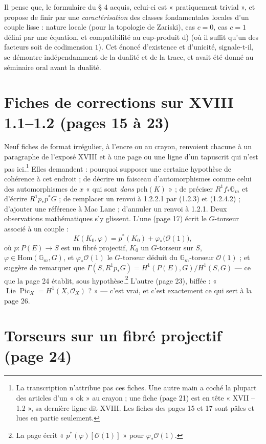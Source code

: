 \documentclass[11pt,a4paper]{article}
\begin{document}
Il pense que, le formulaire du § 4 acquis, celui-ci est « pratiquement
trivial », et propose de finir par une \emph{caractérisation} des classes
fondamentales locales d'un couple lisse : nature locale (pour la topologie de
Zariski), cas $c = 0$, cas $c = 1$ défini par une équation, et compatibilité au
cup-produit d) (où il suffit qu'un des facteurs soit de codimension $1$). Cet
énoncé d'existence et d'unicité, signale-t-il, se démontre indépendamment de
la dualité et de la trace, et avait été donné au séminaire oral avant la
dualité.

\section*{Fiches de corrections sur XVIII 1.1--1.2 (pages 15 à 23)}

Neuf fiches de format irrégulier, à l'encre ou au crayon, renvoient chacune à
un paragraphe de l'exposé XVIII et à une page ou une ligne d'un tapuscrit qui
n'est pas ici.\footnote{La transcription n'attribue pas ces fiches. Une autre
main a coché la plupart des articles d'un « ok » au crayon ; une fiche
(page 21) est en tête « XVII -- 1.2 », sa dernière ligne dit XVIII. Les fiches
des pages 15 et 17 sont pâles et lues en partie seulement.} Elles demandent :
pourquoi supposer une certaine hypothèse de cohérence à cet endroit ; de
décrire un faisceau d'automorphismes comme celui des automorphismes de $x$
« qui sont \emph{dans} $\mathrm{pch}(K)$ » ; de préciser $R^1f_*\mathbb{G}_m$
et d'écrire $R^1p_*p^*G$ ; de remplacer un renvoi à 1.2.2.1 par (1.2.3) et
(1.2.4.2) ; d'ajouter une référence à Mac Lane ; d'annuler un renvoi à 1.2.1.
Deux observations mathématiques s'y glissent. L'une (page 17) écrit le
$G$-torseur associé à un couple :
\[
K(K_0, \varphi) = p^*(K_0) + \varphi_*\bigl(\mathcal{O}(1)\bigr),
\]
où $p\colon P(E) \to S$ est un fibré projectif, $K_0$ un $G$-torseur sur $S$,
$\varphi \in \mathrm{Hom}(\mathbb{G}_m, G)$, et $\varphi_*\mathcal{O}(1)$ le
$G$-torseur déduit du $\mathbb{G}_m$-torseur $\mathcal{O}(1)$ ; et suggère de
remarquer que $\Gamma(S, R^1p_*G) = H^1(P(E), G)/H^1(S, G)$ --- ce que la
page 24 établit, sous hypothèse.\footnote{La page écrit
« $p^*(\varphi)[\mathcal{O}(1)]$ » pour $\varphi_*\mathcal{O}(1)$.} L'autre
(page 23), biffée : « $\operatorname{Lie}\operatorname{Pic}_X =
H^1(X, \mathcal{O}_X)$ ? » --- c'est vrai, et c'est exactement ce qui sert à
la page 26.

\section*{Torseurs sur un fibré projectif (page 24)}
\end{document}

